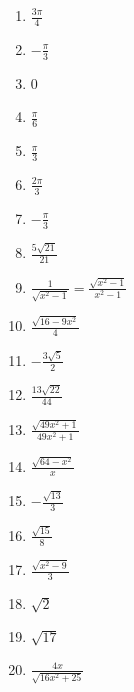 \begin{enumerate}
	\item $\frac{3\pi}{4}$
	\item $-\frac{\pi}{3}$
	\item 0
	\item $\frac{\pi}{6}$
	\item $\frac{\pi}{3}$
	\item $\frac{2\pi}{3}$
	\item $-\frac{\pi}{3}$
    \item $\frac{5\sqrt{21}}{21}$
    \item $\frac{1}{\sqrt{x^2-1}} = \frac{\sqrt{x^2-1}}{x^2-1}$
    \item $\frac{\sqrt{16-9x^2}}{4}$
    \item $-\frac{3\sqrt{5}}{2}$
    \item $\frac{13\sqrt{22}}{44}$
    \item $\frac{\sqrt{49x^2+1}}{49x^2+1}$
    \item $\frac{\sqrt{64-x^2}}{x}$
    \item $-\frac{\sqrt{13}}{3}$
    \item $\frac{\sqrt{15}}{8}$
    \item $\frac{\sqrt{x^2-9}}{3}$
    \item $\sqrt{2}$
    \item $\sqrt{17}$
    \item $\frac{4x}{\sqrt{16x^2+25}}$
\end{enumerate}
